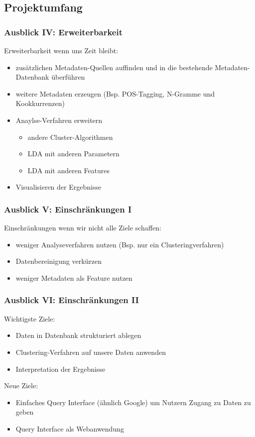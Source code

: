 \documentclass[11pt, a4paper]{beamer}
\begin{document}
\subsection{Projektumfang}
\begin{frame}
\frametitle{Ausblick IV: Erweiterbarkeit}

Erweiterbarkeit wenn uns Zeit bleibt:
\begin{itemize}
	\item zusätzlichen Metadaten-Quellen auffinden und in die bestehende Metadaten-Datenbank überführen
	\item weitere Metadaten erzeugen (Bsp. POS-Tagging, N-Gramme und Kookkurrenzen)
	\item Anaylse-Verfahren erweitern 
	\begin{itemize}
		\item andere Cluster-Algorithmen
		\item LDA mit anderen Parametern
		\item LDA mit anderen Features
	\end{itemize}
	\item Visualisieren der Ergebnisse
\end{itemize}
\end{frame}


\begin{frame}
\frametitle{Ausblick V: Einschränkungen I}

Einschränkungen wenn wir nicht alle Ziele schaffen:
\begin{itemize}
	\item weniger Analyseverfahren nutzen (Bsp. nur ein Clusteringverfahren)
	\item Datenbereinigung verkürzen
	\item weniger Metadaten als Feature nutzen
\end{itemize}
\end{frame}


\begin{frame}
\frametitle{Ausblick VI: Einschränkungen II}

Wichtigste Ziele:
\begin{itemize}
	\item Daten in Datenbank strukturiert ablegen
	\item Clustering-Verfahren auf unsere Daten anwenden
	\item Interpretation der Ergebnisse
\end{itemize}

Neue Ziele:
\begin{itemize}
	\item Einfaches Query Interface (ähnlich Google) um Nutzern Zugang zu Daten zu
	geben
	\item Query Interface als Webanwendung 
\end{itemize}
\end{frame}
\end{document}
